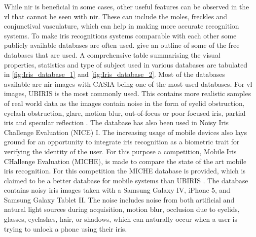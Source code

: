 While \gls{nir} is beneficial in some cases, other useful features can be observed in the \gls{vl} that cannot be seen with \gls{nir}. These can include the moles, freckles and conjunctival vasculature, which can help in making more accurate recognition systems. To make iris recognitions systems comparable with each other some publicly available databases are often used. \cite{Rifaee2017}  give an outline of some of the free databases that are used. A comprehensive table summarising the visual properties, statistics and type of subject used in various databases are tabulated in \autoref{fig:Iris_database_1} and \autoref{fig:Iris_database_2}. Most of the databases available are \gls{nir} images with CASIA being one of the most used databases. For \gls{vl} images, UBIRIS is the most commonly used. This contains more realistic samples of real world data as the images contain noise in the form of eyelid obstruction, eyelash obstruction, glare, motion blur, out-of-focus or poor focused iris, partial iris and specular reflection \citep{Rattani2017}. The database has also been used in Noisy Iris Challenge Evaluation (NICE) I. The increasing usage of mobile devices also lays ground for an opportunity to integrate iris recognition as a biometric trait for verifying the identity of the user. For this purpose a competition, Mobile Iris CHallenge Evaluation (MICHE), is made to compare the state of the art mobile iris recognition. For this competition the MICHE database is provided, which is claimed to be a better database for mobile systems than UBIRIS \citep{DeMarsico2018}. The database contains noisy iris images taken with a Samsung Galaxy IV, iPhone 5, and Samsung Galaxy Tablet II. The noise includes noise from both artificial and natural light sources during acquisition, motion blur, occlusion due to eyelids, glasses, eyelashes, hair, or shadows, which can naturally occur when a user is trying to unlock a phone using their iris. 

